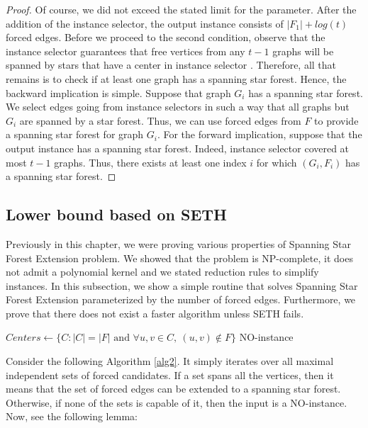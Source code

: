 \documentclass[en]{pracamgr}
\newcommand{\ssf}{spanning star forest}
\newcommand{\ssfep}{{\sc Spanning Star Forest Extension}}
\begin{document}
\begin{proof}
	Of course, we did not exceed the stated limit for the parameter. After the addition of the instance selector, the output instance consists of $|F_1|+log(t)$ forced edges. Before we proceed to the second condition, observe that the instance selector guarantees that free vertices from any $t-1$ graphs will be spanned by stars that have a center in instance selector . Therefore, all that remains is to check if at least one graph has a spanning star forest. Hence, the backward implication is simple. Suppose that graph $G_i$ has a spanning star forest. We select edges going from instance selectors in such a way that all graphs but $G_i$ are spanned by a star forest. Thus, we can use forced edges from $F$ to provide a spanning star forest for graph $G_i$. For the forward implication, suppose that the output instance has a spanning star forest. Indeed, instance selector covered at most $t-1$ graphs. Thus, there exists at least one index $i$ for which $(G_i,F_i)$ has a spanning star forest.
\end{proof}


\subsection{Lower bound based on SETH}

Previously in this chapter, we were proving various properties of \ssfep{} problem. We showed that the problem is NP-complete, it does not admit a polynomial kernel and we stated reduction rules to simplify instances. In this subsection, we show a simple routine that solves \ssfep{} parameterized by the number of forced edges. Furthermore, we prove that there does not exist a faster algorithm unless SETH fails.

\begin{algorithm}\label{alg2}
	\KwResult{\ssf{} of $G$ extending $F$}
	$Centers \leftarrow \{C: |C|=|F| \text{ and } \forall u,v \in C,\ (u,v) \notin F\}$\;
	\Return NO-instance\;
	\caption{Extending a spanning star forest from a reduced graph.}
\end{algorithm}

Consider the following Algorithm \ref{alg2}. It simply iterates over all maximal independent sets of forced candidates. If a set spans all the vertices, then it means that the set of forced edges can be extended to a spanning star forest. Otherwise, if none of the sets is capable of it, then the input is a NO-instance. Now, see the following lemma:
\end{document}
